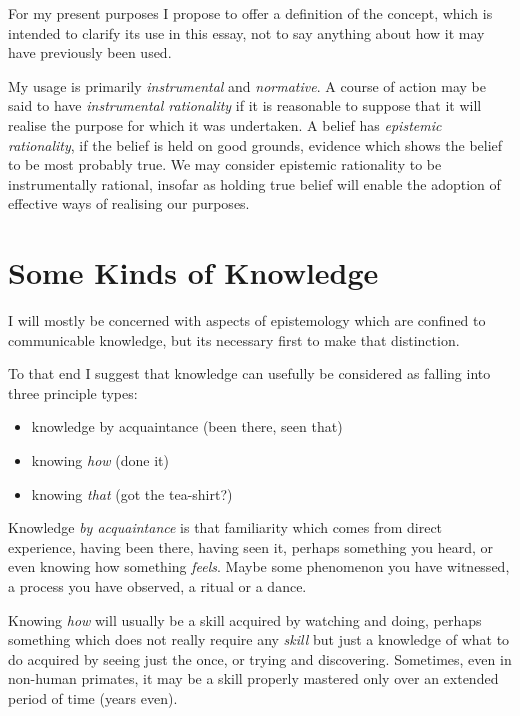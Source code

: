 \documentclass[10pt,titlepage]{article}
\begin{document}
For my present purposes I propose to offer a definition of the concept, which is intended to clarify its use in this essay, not to say anything about how it may have previously been used.

My usage is primarily \emph{instrumental} and \emph{normative}.
A course of action may be said to have \emph{instrumental rationality}  if it is reasonable to suppose that it will realise the purpose for which it was undertaken.
A belief has \emph{epistemic rationality}, if the belief is held on good grounds, evidence which shows the belief to be most probably true.
We may consider epistemic rationality to be instrumentally rational, insofar as holding true belief will enable the adoption of effective ways of realising our purposes.

\section{Some Kinds of Knowledge}

I will mostly be concerned with aspects of epistemology which are confined to communicable knowledge, but its necessary first to make that distinction.

To that end I suggest that knowledge can usefully be considered as falling into three principle types:

\begin{itemize}
\item knowledge by acquaintance (been there, seen that)
\item knowing \emph{how} (done it)
\item knowing \emph{that} (got the tea-shirt?)
\end{itemize}

Knowledge \emph{by acquaintance} is that familiarity which comes from direct experience, having been there, having seen it, perhaps something you heard, or even knowing how something \emph{feels}.
Maybe some phenomenon you have witnessed, a process you have observed, a ritual or a dance.

Knowing \emph{how} will usually be a skill acquired by watching and doing, perhaps something which does not really require any \emph{skill} but just a knowledge of what to do acquired by seeing just the once, or trying and discovering.
Sometimes, even in non-human primates, it may be a skill properly mastered only over an extended period of time (years even).
\end{document}
